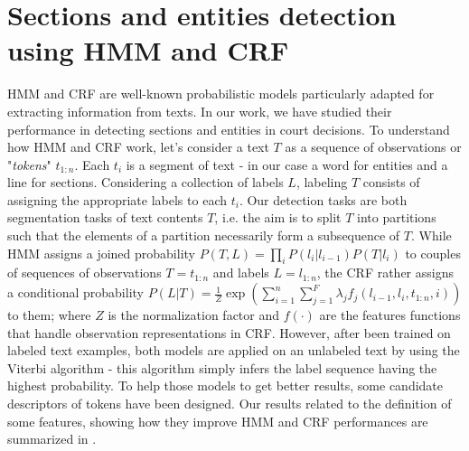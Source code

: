 \documentclass[runningheads,a4paper]{llncs}
\begin{document}
\section{Sections and entities detection using HMM and CRF}

HMM and CRF are well-known probabilistic models particularly adapted for extracting information from texts. 
In our work, we have studied their performance in detecting sections and entities in court decisions. 
To understand how HMM and CRF work, let's consider a text $ T $ as a sequence of observations or "\textit{tokens}" $ t_{1:n} $. Each $ t_i $ is a segment of text - in our case a word for entities and a line for sections. Considering a collection of labels $L$, labeling $ T $ consists of assigning the appropriate labels to each $ t_i $. Our detection tasks are both segmentation tasks of text contents $ T$, i.e. the aim is to split $ T $ into partitions such that the elements of a partition necessarily form a subsequence of $T$.  While HMM  assigns a joined probability $ P (T , L) = \prod\limits_i P(l_i \vert l_{i-1})P(T \vert l_i)$ to couples of sequences of observations $ T = t_{1: n} $ and labels $ L = l_{1:n} $, the CRF rather assigns a conditional probability $P(L|T) = \frac{1}{Z}\exp \left(\sum\limits_{i=1}^n\sum\limits_{j=1}^F \lambda_j  f_j(l_{i-1},l_i,t_{1:n},i)\right)$ to them; where $Z$ is the normalization factor and $f(\cdot)$ are the features functions that handle observation representations in CRF. However, after been trained on labeled text examples, both models are applied on an unlabeled text by using the Viterbi algorithm 
 - this algorithm simply infers the label sequence having the highest probability. 
To help those models to get better results, some candidate descriptors of tokens have been designed. Our results related to the definition of some features, showing how they improve HMM and CRF performances are summarized in \cite{tagny2017sectNerhmmcrf}.
\end{document}
